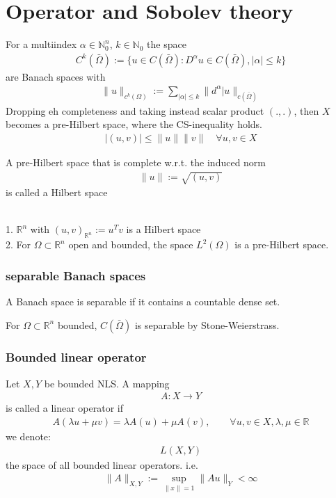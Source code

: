 \section{Operator and Sobolev theory}
For a multiindex $\alpha \in \mathbb{N}_0^n$, $k \in \mathbb{N}_0$ the space
\begin{align*}
	C^k(\bar{\Omega}) := \{ u \in C(\bar{\Omega}): D^\alpha u \in C(\bar{\Omega}), |\alpha| \le k\}
\end{align*}
are Banach spaces with 
\begin{align*}
	\|u\|_{c^k(\Omega)}:= \sum_{|\alpha| \le k} \|d^\alpha|u\|_{c(\bar{\Omega})}
\end{align*}
Dropping eh completeness and taking instead scalar product $(., .)$, then $X$ becomes a pre-Hilbert space, where the CS-inequality holds. 
\begin{align*}
	|(u, v)| \le \|u\| \|v\| \quad \forall u, v \in X
\end{align*}

A pre-Hilbert space that is complete w.r.t. the induced norm
\begin{align*}
	\|u\|:= \sqrt{(u, v)}
\end{align*}
is called a Hilbert space

\begin{example}\quad\\
	1. $\mathbb{R}^n$ with $(u, v)_{\mathbb{R}^n}:= u^T v$ is a Hilbert space\\
	2. For $\Omega \subset \mathbb{R}^n$ open and bounded, the space $L^2(\Omega)$ is a pre-Hilbert space. 
\end{example}

\subsubsection*{separable Banach spaces}
A Banach space is separable if it contains a countable dense set. 

\example
For $\Omega \subset \mathbb{R}^n$ bounded, $C(\bar{\Omega})$ is separable by Stone-Weierstrass. 

\subsubsection*{Bounded linear operator}
Let $X, Y$ be bounded NLS. A mapping 
\begin{align*}
	A: X \rightarrow Y
\end{align*}
is called a linear operator if 
\begin{align*}
	A(\lambda u + \mu v) = \lambda A(u) + \mu A(v), \qquad \forall u, v \in X, \lambda, \mu \in \mathbb{R}
\end{align*}
we denote:
\begin{align*}
	L(X,Y) 
\end{align*}
the space of all bounded linear operators. i.e.
\begin{align*}
	\|A\|_{X, Y}:= \sup_{\|x\| = 1} \|Au\|_Y < \infty
\end{align*}

